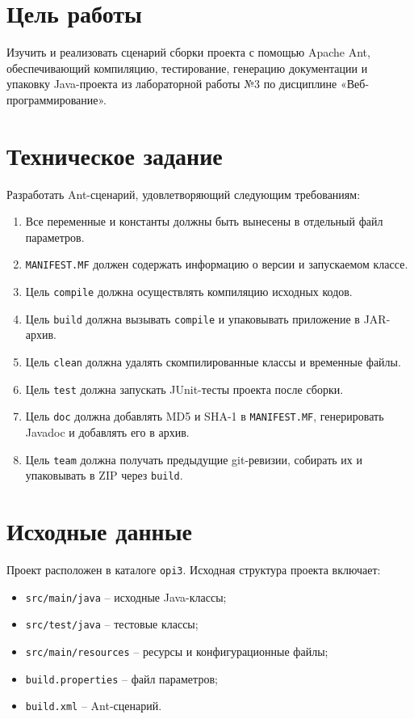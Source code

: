 \documentclass[12pt]{article}
\begin{document}

\clearpage
\tableofcontents
\newpage

\section{Цель работы}

Изучить и реализовать сценарий сборки проекта с помощью Apache Ant, обеспечивающий компиляцию, тестирование, генерацию документации и упаковку Java-проекта из лабораторной работы №3 по дисциплине «Веб-программирование».

\section{Техническое задание}

Разработать Ant-сценарий, удовлетворяющий следующим требованиям:

\begin{enumerate}[leftmargin=*, label=\arabic*)]
    \item Все переменные и константы должны быть вынесены в отдельный файл параметров.
    \item \texttt{MANIFEST.MF} должен содержать информацию о версии и запускаемом классе.
    \item Цель \texttt{compile} должна осуществлять компиляцию исходных кодов.
    \item Цель \texttt{build} должна вызывать \texttt{compile} и упаковывать приложение в JAR-архив.
    \item Цель \texttt{clean} должна удалять скомпилированные классы и временные файлы.
    \item Цель \texttt{test} должна запускать JUnit-тесты проекта после сборки.
    \item Цель \texttt{doc} должна добавлять MD5 и SHA-1 в \texttt{MANIFEST.MF}, генерировать Javadoc и добавлять его в архив.
    \item Цель \texttt{team} должна получать предыдущие git-ревизии, собирать их и упаковывать в ZIP через \texttt{build}.
\end{enumerate}

\section{Исходные данные}

Проект расположен в каталоге \texttt{opi3}. Исходная структура проекта включает:

\begin{itemize}[leftmargin=1.5em]
    \item \texttt{src/main/java} -- исходные Java-классы;
    \item \texttt{src/test/java} -- тестовые классы;
    \item \texttt{src/main/resources} -- ресурсы и конфигурационные файлы;
    \item \texttt{build.properties} -- файл параметров;
    \item \texttt{build.xml} -- Ant-сценарий.
\end{itemize}
\end{document}
